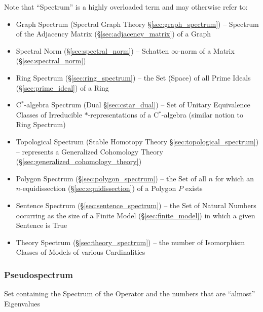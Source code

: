 \fist Note that ``Spectrum'' is a highly overloaded term and may otherwise
refer to:
\begin{itemize}
  \item Graph Spectrum (Spectral Graph Theory \S\ref{sec:graph_spectrum}) --
    Spectrum of the Adjacency Matrix (\S\ref{sec:adjacency_matrix}) of a Graph

  \item Spectral Norm (\S\ref{sec:spectral_norm}) -- Schatten $\infty$-norm of
    a Matrix (\S\ref{sec:spectral_norm})

  \item Ring Spectrum (\S\ref{sec:ring_spectrum}) -- the Set (Space) of all
    Prime Ideals (\S\ref{sec:prime_ideal}) of a Ring
  \item C$^*$-algebra Spectrum (Dual \S\ref{sec:cstar_dual}) -- Set of Unitary
    Equivalence Classes of Irreducible $*$-representations of a C$^*$-algebra
    (similar notion to Ring Spectrum)

  \item Topological Spectrum (Stable Homotopy Theory
    \S\ref{sec:topological_spectrum}) -- represents a Generalized Cohomology
    Theory (\S\ref{sec:generalized_cohomology_theory})

  \item Polygon Spectrum (\S\ref{sec:polygon_spectrum}) -- the Set of all $n$
    for which an $n$-equidissection (\S\ref{sec:equidissection}) of a Polygon
    $P$ exists

  \item Sentence Spectrum (\S\ref{sec:sentence_spectrum}) -- the Set of Natural
    Numbers occurring as the size of a Finite Model
    (\S\ref{sec:finite_model}) in which a given Sentence is True
  \item Theory Spectrum (\S\ref{sec:theory_spectrum}) -- the number of
    Isomorphism Classes of Models of various Cardinalities
\end{itemize}



\subsubsection{Pseudospectrum}\label{sec:pseudospectrum}

Set containing the Spectrum of the Operator and the numbers that are ``almost''
Eigenvalues



